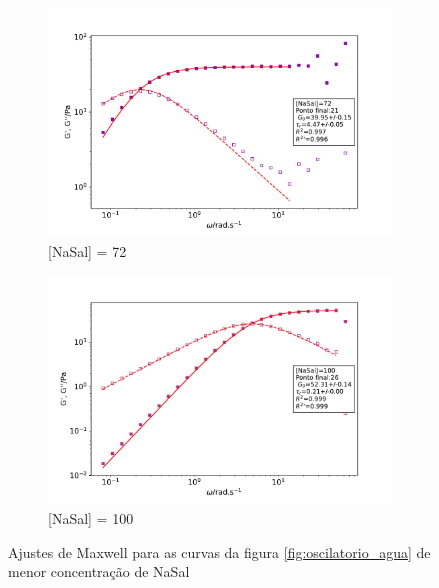 \begin{figure}[h]
			\begin{subfigure}[t]{0.5\textwidth}
				\includegraphics[width=\textwidth]{imagens/reologia/oscilatorio_agua_72}
				\caption{[NaSal] = 72\mM}
				\label{fig:oscilatorio_agua_72}
			\end{subfigure} %
			\begin{subfigure}[t]{0.5\textwidth}
				\includegraphics[width=\textwidth]{imagens/reologia/oscilatorio_agua_100}
				\caption{[NaSal] = 100\mM}
				\label{fig:oscilatorio_agua_100}
			\end{subfigure}
		
		\caption{Ajustes de Maxwell para as curvas da figura \ref{fig:oscilatorio_agua} de menor concentração de NaSal}
		\label{fig:oscilatorio_agua_maxwell1}
		\end{figure}
	
